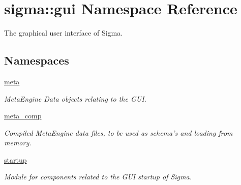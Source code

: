 \hypertarget{namespacesigma_1_1gui}{\section{sigma\-:\-:gui Namespace Reference}
\label{namespacesigma_1_1gui}
}


The graphical user interface of Sigma.  


\subsection*{Namespaces}
\begin{DoxyCompactItemize}
\item 
\hyperlink{namespacesigma_1_1gui_1_1meta}{meta}
\begin{DoxyCompactList}\small\item\em Meta\-Engine Data objects relating to the G\-U\-I. \end{DoxyCompactList}\item 
\hyperlink{namespacesigma_1_1gui_1_1meta__comp}{meta\-\_\-comp}
\begin{DoxyCompactList}\small\item\em Compiled Meta\-Engine data files, to be used as schema's and loading from memory. \end{DoxyCompactList}\item 
\hyperlink{namespacesigma_1_1gui_1_1startup}{startup}
\begin{DoxyCompactList}\small\item\em Module for components related to the G\-U\-I startup of Sigma. \end{DoxyCompactList}\end{DoxyCompactItemize}
